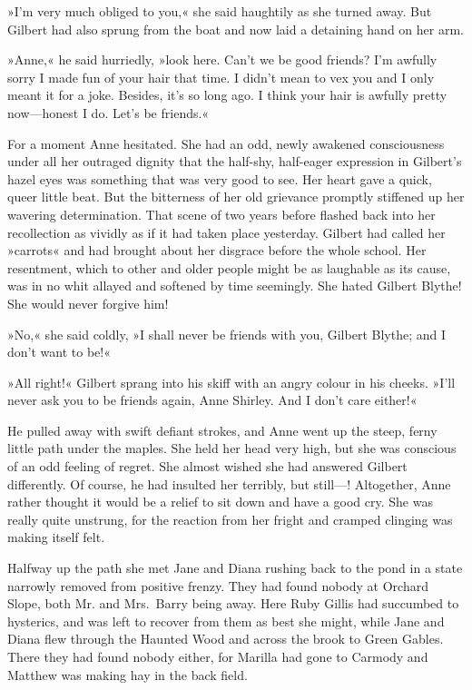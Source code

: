»I'm very much obliged to you,« she said haughtily as she turned away. But Gilbert had also sprung from the boat and now laid a detaining hand on her arm.

»Anne,« he said hurriedly, »look here. Can't we be good friends? I'm awfully sorry I made fun of your hair that time. I didn't mean to vex you and I only meant it for a joke. Besides, it's so long ago. I think your hair is awfully pretty now—honest I do. Let's be friends.«

For a moment Anne hesitated. She had an odd, newly awakened consciousness under all her outraged dignity that the half-shy, half-eager expression in Gilbert's hazel eyes was something that was very good to see. Her heart gave a quick, queer little beat. But the bitterness of her old grievance promptly stiffened up her wavering determination. That scene of two years before flashed back into her recollection as vividly as if it had taken place yesterday. Gilbert had called her »carrots« and had brought about her disgrace before the whole school. Her resentment, which to other and older people might be as laughable as its cause, was in no whit allayed and softened by time seemingly. She hated Gilbert Blythe! She would never forgive him!

»No,« she said coldly, »I shall never be friends with you, Gilbert Blythe; and I don't want to be!«

»All right!« Gilbert sprang into his skiff with an angry colour in his cheeks. »I'll never ask you to be friends again, Anne Shirley. And I don't care either!«

He pulled away with swift defiant strokes, and Anne went up the steep, ferny little path under the maples. She held her head very high, but she was conscious of an odd feeling of regret. She almost wished she had answered Gilbert differently. Of course, he had insulted her terribly, but still—! Altogether, Anne rather thought it would be a relief to sit down and have a good cry. She was really quite unstrung, for the reaction from her fright and cramped clinging was making itself felt.

Halfway up the path she met Jane and Diana rushing back to the pond in a state narrowly removed from positive frenzy. They had found nobody at Orchard Slope, both Mr. and Mrs.~Barry being away. Here Ruby Gillis had succumbed to hysterics, and was left to recover from them as best she might, while Jane and Diana flew through the Haunted Wood and across the brook to Green Gables. There they had found nobody either, for Marilla had gone to Carmody and Matthew was making hay in the back field.

